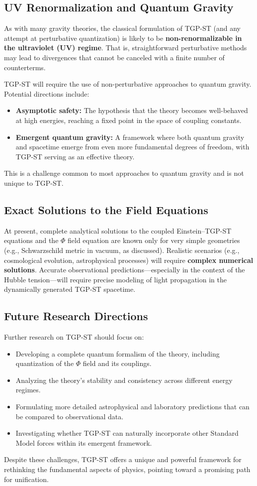 \documentclass[11pt,a4paper]{article}
\begin{document}
\subsection{UV Renormalization and Quantum Gravity}
As with many gravity theories, the classical formulation of TGP-ST (and any attempt at perturbative quantization) is likely to be \textbf{non-renormalizable in the ultraviolet (UV) regime}. That is, straightforward perturbative methods may lead to divergences that cannot be canceled with a finite number of counterterms.

TGP-ST will require the use of non-perturbative approaches to quantum gravity. Potential directions include:
\begin{itemize}
    \item \textbf{Asymptotic safety:} The hypothesis that the theory becomes well-behaved at high energies, reaching a fixed point in the space of coupling constants.
    \item \textbf{Emergent quantum gravity:} A framework where both quantum gravity and spacetime emerge from even more fundamental degrees of freedom, with TGP-ST serving as an effective theory.
\end{itemize}
This is a challenge common to most approaches to quantum gravity and is not unique to TGP-ST.

\subsection{Exact Solutions to the Field Equations}
At present, complete analytical solutions to the coupled Einstein–TGP-ST equations and the $\Phi$ field equation are known only for very simple geometries (e.g., Schwarzschild metric in vacuum, as discussed). Realistic scenarios (e.g., cosmological evolution, astrophysical processes) will require \textbf{complex numerical solutions}. Accurate observational predictions—especially in the context of the Hubble tension—will require precise modeling of light propagation in the dynamically generated TGP-ST spacetime.

\subsection{Future Research Directions}
Further research on TGP-ST should focus on:
\begin{itemize}
    \item Developing a complete quantum formalism of the theory, including quantization of the $\Phi$ field and its couplings.
    \item Analyzing the theory’s stability and consistency across different energy regimes.
    \item Formulating more detailed astrophysical and laboratory predictions that can be compared to observational data.
    \item Investigating whether TGP-ST can naturally incorporate other Standard Model forces within its emergent framework.
\end{itemize}
Despite these challenges, TGP-ST offers a unique and powerful framework for rethinking the fundamental aspects of physics, pointing toward a promising path for unification.
\end{document}
